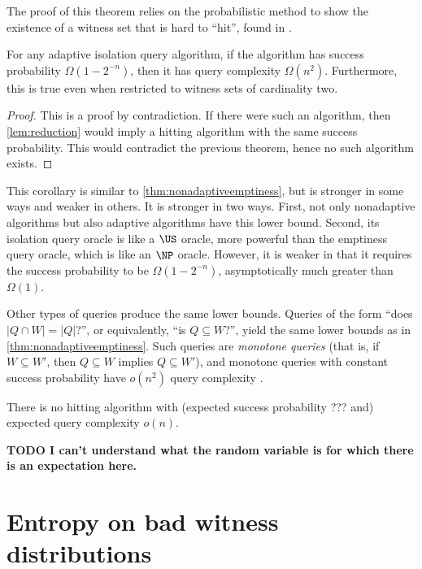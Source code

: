 \documentclass{article}
\newcommand{\todo}[1]{\textbf{TODO #1}}
\begin{document}
The proof of this theorem relies on the probabilistic method to show the existence of a witness set that is hard to ``hit'', found in \autocite{ablp91}.

\begin{corollary}\label{cor:isolationalg}
  For any adaptive isolation query algorithm, if the algorithm has success probability $\Omega(1 - 2^{-n})$, then it has query complexity $\Omega(n^2)$.
  Furthermore, this is true even when restricted to witness sets of cardinality two.
\end{corollary}
\begin{proof}
  This is a proof by contradiction.
  If there were such an algorithm, then \autoref{lem:reduction} would imply a hitting algorithm with the same success probability.
  This would contradict the previous theorem, hence no such algorithm exists.
\end{proof}

This corollary is similar to \autoref{thm:nonadaptiveemptiness}, but is stronger in some ways and weaker in others.
It is stronger in two ways.
First, not only nonadaptive algorithms but also adaptive algorithms have this lower bound.
Second, its isolation query oracle is like a $\US$ oracle, more powerful than the emptiness query oracle, which is like an $\NP$ oracle.
However, it is weaker in that it requires the success probability to be $\Omega(1 - 2^{-n})$, asymptotically much greater than $\Omega(1)$.

Other types of queries produce the same lower bounds.
Queries of the form ``does $|Q \cap W| = |Q|$?'', or equivalently, ``is $Q \subseteq W$?'', yield the same lower bounds as in \autoref{thm:nonadaptiveemptiness}.
Such queries are \emph{monotone queries} (that is, if $W \subseteq W'$, then $Q \subseteq W$ implies $Q \subseteq W'$), and monotone queries with constant success probability have $o(n^2)$ query complexity \autocite[Theorem~1.3]{krw14}.

\begin{theorem}
  There is no hitting algorithm with (expected success probability ??? and) expected query complexity $o(n)$.
\end{theorem}

\todo{I can't understand what the random variable is for which there is an expectation here.}

\section{Entropy on bad witness distributions}
\end{document}
